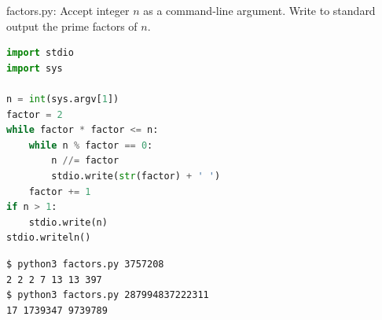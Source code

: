 \documentclass[8pt,a4paper,compress]{beamer}
\begin{document}
\begin{frame}[fragile]
\pause

\begin{framed}
\tiny factors.py: Accept integer $n$ as a command-line argument. Write to standard output the prime factors of $n$.
\end{framed}

\begin{lstlisting}[language=Python]
import stdio
import sys

n = int(sys.argv[1])
factor = 2
while factor * factor <= n:
    while n % factor == 0:
        n //= factor
        stdio.write(str(factor) + ' ')
    factor += 1
if n > 1:
    stdio.write(n)
stdio.writeln()
\end{lstlisting}

\pause

\begin{lstlisting}[language={}]
$ python3 factors.py 3757208
2 2 2 7 13 13 397
$ python3 factors.py 287994837222311
17 1739347 9739789
\end{lstlisting}
\end{frame}
\end{document}
